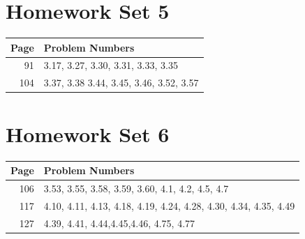 \documentclass{book}
\begin{document}
\section{Homework Set 5}
\begin{tabular}{r|l}
Page & Problem Numbers\\
\hline
91 & 3.17, 3.27, 3.30, 3.31, 3.33, 3.35\\
104 & 3.37, 3.38 3.44, 3.45, 3.46, 3.52, 3.57\\
\end{tabular}

\section{Homework Set 6}
\begin{tabular}{r|l}
Page & Problem Numbers\\
\hline
106 & 3.53, 3.55, 3.58, 3.59, 3.60, 4.1, 4.2, 4.5, 4.7\\
117 & 4.10, 4.11, 4.13, 4.18, 4.19, 4.24, 4.28, 4.30, 4.34, 4.35, 4.49\\
127 & 4.39, 4.41, 4.44,4.45,4.46, 4.75, 4.77\\
\end{tabular}

\newpage
\nocite{textbook}
\printbibliography
\end{document}

